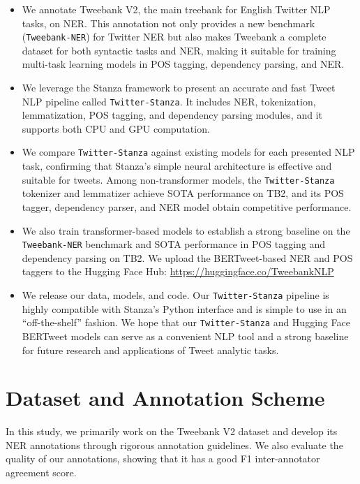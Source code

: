 \documentclass[10pt, a4paper]{article}
\begin{document}
\begin{itemize}
\setlength\itemsep{0em}
\item We annotate Tweebank V2, the main treebank for English Twitter NLP tasks, on NER. This annotation not only provides a new benchmark (\texttt{Tweebank-NER}) for Twitter NER but also makes Tweebank a complete dataset for both syntactic tasks and NER, making it suitable for training multi-task learning models in POS tagging, dependency parsing, and NER.
\item We leverage the Stanza framework to present an accurate and fast Tweet NLP pipeline called \verb|Twitter-Stanza|. It includes NER, tokenization, lemmatization, POS tagging, and dependency parsing modules, and it supports both CPU and GPU computation. 

\item We compare \verb|Twitter-Stanza| against existing models for each presented NLP task, confirming that Stanza's simple neural architecture is effective and suitable for tweets. Among non-transformer models, the \verb|Twitter-Stanza| tokenizer and lemmatizer achieve SOTA performance on TB2, and its POS tagger, dependency parser, and NER model obtain competitive performance. 




\item We also train transformer-based models to establish a strong baseline on the \texttt{Tweebank-NER} benchmark and SOTA performance in POS tagging and dependency parsing on TB2. We upload the BERTweet-based NER and POS taggers to the Hugging Face Hub: \url{https://huggingface.co/TweebankNLP}

\item We release our data, models, and code. Our \verb|Twitter-Stanza| pipeline is highly compatible with Stanza's Python interface and is simple to use in an ``off-the-shelf'' fashion. We hope that our \verb|Twitter-Stanza| and Hugging Face BERTweet models can serve as a convenient NLP tool and a strong baseline for future research and applications of Tweet analytic tasks. 


\end{itemize}










\section{Dataset and Annotation Scheme}
In this study, we primarily work on the Tweebank V2 dataset and develop its NER annotations through rigorous annotation guidelines. We also evaluate the quality of our annotations, showing that it has a good F1 inter-annotator agreement score. 
\end{document}
